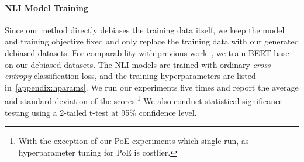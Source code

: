 \begin{table}[bt]
\begin{center}
\caption{Data size of the constructed debiased datasets for SNLI and MNLI.} \label{tab:data-size}
\end{center}
\end{table}






\paragraph{NLI Model Training}

Since our method directly debiases the training data itself, we keep the model and training objective fixed and only replace the training data with our generated debiased datasets.
For comparability with previous work~\citep{karimi-mahabadi-etal-2020-end,utama-etal-2020-mind,sanh2021learning}, we train BERT-base~\citep{bert} on our debiased datasets.
The NLI models are trained with ordinary \emph{cross-entropy} classification loss,
and the training hyperparameters are listed in~\cref{appendix:hparams}.
We run our experiments five times and report the average and standard deviation of the scores.\footnote{With the exception of our PoE experiments which single run, as hyperparameter tuning for PoE is costlier.}
We also conduct statistical significance testing using a 2-tailed t-test at 95\% confidence level.


